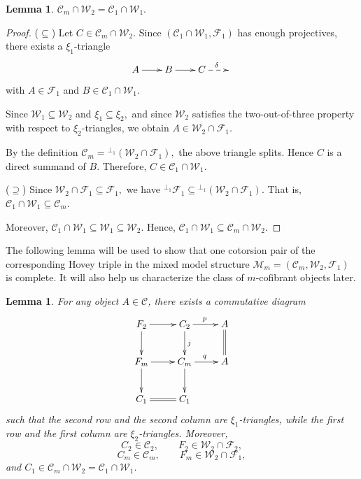 \documentclass[11pt,a4paper]{amsart}
\numberwithin{equation}{section}
\theoremstyle{plain}
\newtheorem{lem}[thm]{Lemma}
\begin{document}
\begin{lem}
	$
	\mathcal{C}_m\cap \mathcal{W}_2
	=
	\mathcal{C}_1\cap \mathcal{W}_1.
	$
\end{lem}
\begin{proof}
	(\(\subseteq\))
	Let \(C\in \mathcal{C}_m\cap\mathcal{W}_2\).
	Since \((\mathcal{C}_1\cap\mathcal{W}_1,\mathcal{F}_1)\) has enough projectives, there exists a $\xi_{1}$-triangle
$$\xymatrix@C=2em{A\ar[r]&B\ar[r]&C\ar@{-->}[r]^{\delta}&}$$
	with
	\(
	A\in\mathcal{F}_1
	\)
	and
	\(
	B\in\mathcal{C}_1\cap\mathcal{W}_1.
	\)
	
	Since
	\(
	\mathcal{W}_1\subseteq\mathcal{W}_2
	\)
	and
	\(
	\xi_1\subseteq\xi_2,
	\)
	and since \(\mathcal{W}_2\) satisfies the two-out-of-three property with respect to $\xi_2$-triangles, we obtain
	\(
	A\in\mathcal{W}_2\cap\mathcal{F}_1.
	\)
	
	By the definition
	\(
	\mathcal{C}_m={}^{\perp_1}(\mathcal{W}_2\cap\mathcal{F}_1),
	\)
	the above triangle splits. Hence \(C\) is a direct summand of \(B\). Therefore,
	\(
	C\in\mathcal{C}_1\cap\mathcal{W}_1.
	\)
	
	(\(\supseteq\))
	Since
	\(
	\mathcal{W}_2\cap\mathcal{F}_1\subseteq\mathcal{F}_1,
	\)
	we have
	\(
	{}^{\perp_1}\mathcal{F}_1
	\subseteq
	{}^{\perp_1}(\mathcal{W}_2\cap\mathcal{F}_1).
	\)
	That is,
	\(
	\mathcal{C}_1\cap\mathcal{W}_1
	\subseteq
	\mathcal{C}_m.
	\)
	
	Moreover,
	\(
	\mathcal{C}_1\cap\mathcal{W}_1
	\subseteq
	\mathcal{W}_1
	\subseteq
	\mathcal{W}_2.
	\)
	Hence,
	\(
	\mathcal{C}_1\cap\mathcal{W}_1
	\subseteq
	\mathcal{C}_m\cap\mathcal{W}_2.
	\)
\end{proof}

The following lemma will be used to show that one cotorsion pair of the corresponding Hovey triple in the mixed model structure $\mathcal{M}_m=(\mathcal{C}_m,\mathcal{W}_2,\mathcal{F}_1)$ is complete. It will also help us characterize the class of $m$-cofibrant objects later.

\begin{lem}\label{lem:mixed-approximation}
	For any object $A\in\mathscr{C}$, there exists a commutative diagram
	\[
	\xymatrix{
		F_2 \ar[r] \ar[d] & C_2 \ar[r]^{p} \ar[d]^{j} & A \ar@{=}[d] \\
		F_m \ar[r] \ar[d] & C_m \ar[r]^{q} \ar[d] & A \\
		C_1 \ar@{=}[r] & C_1 &
	}
	\]
	such that the second row and the second column are $\xi_{1}$-triangles, while the first row and the first column are $\xi_{2}$-triangles. Moreover,
	\[ C_2\in\mathcal{C}_2, \qquad F_2\in\mathcal{W}_2\cap\mathcal{F}_2, \]
	\[ C_m\in\mathcal{C}_m, \qquad F_m\in\mathcal{W}_2\cap\mathcal{F}_1, \]
	and $C_1 \in \mathcal{C}_m\cap\mathcal{W}_2 = \mathcal{C}_1\cap\mathcal{W}_1$.
\end{lem}
\end{document}
